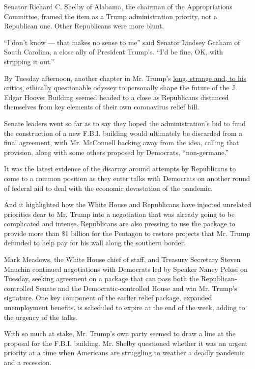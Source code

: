 Senator Richard C. Shelby of Alabama, the chairman of the Appropriations
Committee, framed the item as a Trump administration priority, not a
Republican one. Other Republicans were more blunt.

``I don't know --- that makes no sense to me'' said Senator Lindsey
Graham of South Carolina, a close ally of President Trump's. ``I'd be
fine, OK, with stripping it out.''

By Tuesday afternoon, another chapter in Mr. Trump's
\href{https://www.nytimes3xbfgragh.onion/2018/11/02/us/politics/fbi-building-costs.html}{long,
strange and, to his critics, ethically questionable} odyssey to
personally shape the future of the J. Edgar Hoover Building seemed
headed to a close as Republicans distanced themselves from key elements
of their own coronavirus relief bill.

Senate leaders went so far as to say they hoped the administration's bid
to fund the construction of a new F.B.I. building would ultimately be
discarded from a final agreement, with Mr. McConnell backing away from
the idea, calling that provision, along with some others proposed by
Democrats, ``non-germane.''

It was the latest evidence of the disarray around attempts by
Republicans to come to a common position as they enter talks with
Democrats on another round of federal aid to deal with the economic
devastation of the pandemic.

And it highlighted how the White House and Republicans have injected
unrelated priorities dear to Mr. Trump into a negotiation that was
already going to be complicated and intense. Republicans are also
pressing to use the package to provide more than \$1 billion for the
Pentagon to restore projects that Mr. Trump defunded to help pay for his
wall along the southern border.

Mark Meadows, the White House chief of staff, and Treasury Secretary
Steven Mnuchin continued negotiations with Democrats led by Speaker
Nancy Pelosi on Tuesday, seeking agreement on a package that can pass
both the Republican-controlled Senate and the Democratic-controlled
House and win Mr. Trump's signature. One key component of the earlier
relief package, expanded unemployment benefits, is scheduled to expire
at the end of the week, adding to the urgency of the talks.

With so much at stake, Mr. Trump's own party seemed to draw a line at
the proposal for the F.B.I. building. Mr. Shelby questioned whether it
was an urgent priority at a time when Americans are struggling to
weather a deadly pandemic and a recession.


